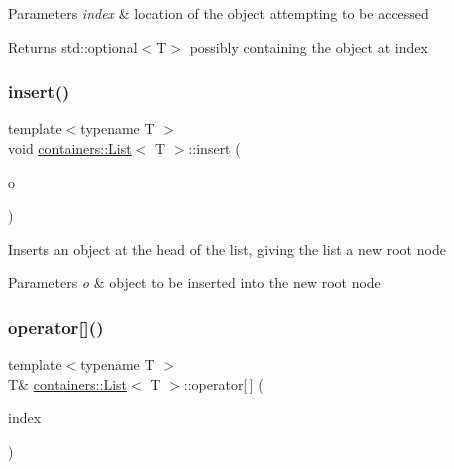 \begin{DoxyParams}{Parameters}
{\em index} & location of the object attempting to be accessed\\
\hline
\end{DoxyParams}
\begin{DoxyReturn}{Returns}
{\ttfamily std\+::optional$<$\+T$>$} possibly containing the object at {\ttfamily index} 
\end{DoxyReturn}
\mbox{\label{classcontainers_1_1_list_abea32f6ba898dde0359e221c0a89c32f}} 
\subsubsection{\texorpdfstring{insert()}{insert()}}
{\footnotesize\ttfamily template$<$typename T $>$ \\
void \hyperlink{classcontainers_1_1_list}{containers\+::\+List}$<$ T $>$\+::insert (\begin{DoxyParamCaption}\item[{T \&}]{o }\end{DoxyParamCaption})}

Inserts an object at the head of the list, giving the list a new root node


\begin{DoxyParams}{Parameters}
{\em o} & object to be inserted into the new root node \\
\hline
\end{DoxyParams}
\mbox{\label{classcontainers_1_1_list_ad3b0886c4fe5c1d62f466ade98d02b9a}} 
\subsubsection{\texorpdfstring{operator[]()}{operator[]()}}
{\footnotesize\ttfamily template$<$typename T $>$ \\
T\& \hyperlink{classcontainers_1_1_list}{containers\+::\+List}$<$ T $>$\+::operator\mbox{[}$\,$\mbox{]} (\begin{DoxyParamCaption}\item[{size\+\_\+t}]{index }\end{DoxyParamCaption})}

